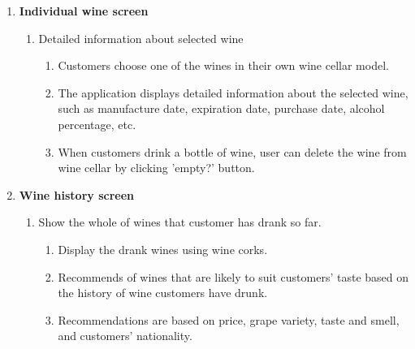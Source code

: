 \documentclass[sigconf, nonacm]{acmart}
\begin{document}
\begin{enumerate}
\begin{enumerate}
\end{enumerate}

\item \textbf{Individual wine screen}
\begin{enumerate}
\item Detailed information about selected wine
\begin{enumerate}
    \item Customers choose one of the wines in their own wine
    cellar model.
    \item The application displays detailed information about 	the selected wine, such as manufacture date, expiration 	date, purchase date, alcohol percentage, etc.
    \item When customers drink a bottle of wine, user can delete the wine from wine cellar by clicking 'empty?' button.\\
\end{enumerate}
\end{enumerate}
\item \textbf{Wine history screen}
\begin{enumerate}
\item Show the whole of wines that customer has drank so far.
\begin{enumerate}
    \item Display the drank wines using wine corks.
    \item Recommends of wines that are likely to suit
	customers’ taste based on the history of wine customers	have drunk.
	\item Recommendations are based on price, grape variety,  
   	taste and smell, and customers’ nationality.
\end{enumerate}
\end{enumerate}
\end{enumerate}

\end{document}
